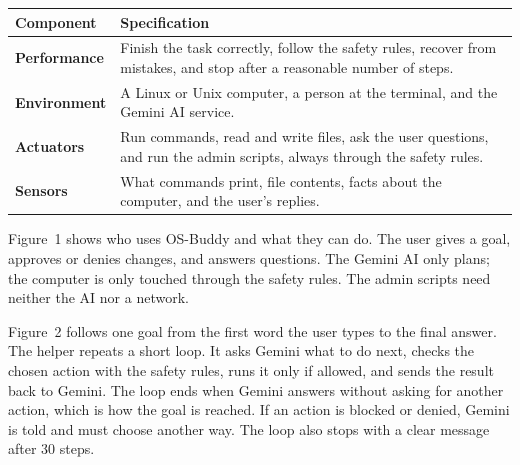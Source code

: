 \documentclass[11pt,a4paper]{article}
\newcommand{\hdrrow}{\rowcolor{hdrgrey}}
\newcommand{\sect}[1]{\par\vspace{0.5em}{\large\bfseries #1}\par\vspace{0.1em}}
\begin{document}
\begin{center}
\begingroup\small
\begin{tabularx}{\linewidth}{|>{\bfseries}P{2.2cm}|Y|}
\hline
\hdrrow Component & \textbf{Specification} \\ \hline
Performance & Finish the task correctly, follow the safety rules, recover from mistakes, and stop after a reasonable number of steps. \\ \hline
Environment & A Linux or Unix computer, a person at the terminal, and the Gemini AI service. \\ \hline
Actuators & Run commands, read and write files, ask the user questions, and run the admin scripts, always through the safety rules. \\ \hline
Sensors & What commands print, file contents, facts about the computer, and the user’s replies. \\ \hline
\end{tabularx}
\endgroup
\end{center}

\sect{How the Agent Works}
Figure~1 shows who uses OS-Buddy and what they can do. The user gives a goal, approves or denies changes, and answers questions. The Gemini AI only plans; the computer is only touched through the safety rules. The admin scripts need neither the AI nor a network.

Figure~2 follows one goal from the first word the user types to the final answer. The helper repeats a short loop. It asks Gemini what to do next, checks the chosen action with the safety rules, runs it only if allowed, and sends the result back to Gemini. The loop ends when Gemini answers without asking for another action, which is how the goal is reached. If an action is blocked or denied, Gemini is told and must choose another way. The loop also stops with a clear message after 30 steps.
\newpage
\end{document}
